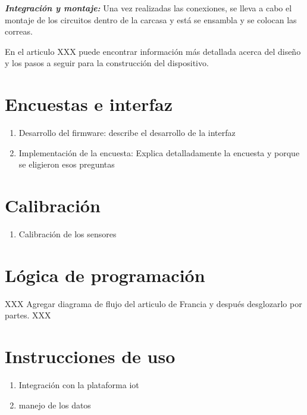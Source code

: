 \documentclass[
  letterpaper,
  DIV=11,
  numbers=noendperiod]{scrreport}
\providecommand{\tightlist}{%
  \setlength{\itemsep}{0pt}\setlength{\parskip}{0pt}}\usepackage{longtable,booktabs,array}
\begin{document}
\textbf{\emph{Integración y montaje:}} Una vez realizadas las
conexiones, se lleva a cabo el montaje de los circuitos dentro de la
carcasa y está se ensambla y se colocan las correas.

En el articulo XXX puede encontrar información más detallada acerca del
diseño y los pasos a seguir para la construcción del dispositivo.

\section{Encuestas e interfaz}\label{encuestas-e-interfaz}

\begin{enumerate}
\def\labelenumi{\arabic{enumi}.}
\tightlist
\item
  Desarrollo del firmware: describe el desarrollo de la interfaz
\item
  Implementación de la encuesta: Explica detalladamente la encuesta y
  porque se eligieron esos preguntas
\end{enumerate}

\section{Calibración}\label{calibraciuxf3n}

\begin{enumerate}
\def\labelenumi{\arabic{enumi}.}
\tightlist
\item
  Calibración de los sensores
\end{enumerate}

\section{Lógica de programación}\label{luxf3gica-de-programaciuxf3n}

XXX Agregar diagrama de flujo del articulo de Francia y después
desglozarlo por partes. XXX

\section{Instrucciones de uso}\label{instrucciones-de-uso}

\begin{enumerate}
\def\labelenumi{\arabic{enumi}.}
\tightlist
\item
  Integración con la plataforma iot
\item
  manejo de los datos
\end{enumerate}
\end{document}

